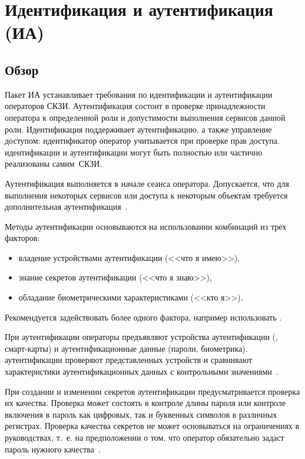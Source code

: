\section{Идентификация и аутентификация (ИА)}\label{IA}

\subsection{Обзор}\label{IA.Intro}

Пакет ИА устанавливает требования по идентификации и аутентификации операторов 
СКЗИ. Аутентификация состоит в проверке принадлежности оператора к определенной 
роли и допустимости выполнения сервисов данной роли. Идентификация поддерживает 
аутентификацию, а также управление доступом: идентификатор оператор 
учитывается при проверке прав доступа.
%
 идентификации и аутентификации могут быть полностью или 
частично реализованы самим~СКЗИ.

Аутентификация выполняется в начале сеанса оператора.
Допускается, что для выполнения некоторых сервисов 
или доступа к некоторым объектам требуется дополнительная 
аутентификация~. 

Методы аутентификации основываются на использовании комбинаций из трех факторов:
\begin{itemize}
\item
владение устройствами аутентификации (<<что я имею>>), 
\item
знание секретов аутентификации (<<что я знаю>>), 
\item
обладание биометрическими характеристиками (<<кто я>>).
\end{itemize}

Рекомендуется задействовать более одного фактора, например использовать 
.

При аутентификации операторы предъявляют устройства аутентификации 
(, смарт-карты) и  аутентификационные данные 
(пароли, биометрика).
%
 аутентификации проверяют  представленных 
устройств и сравнивают характеристики аутентификационных данных с контрольными  
значениями~.

При создании и изменении секретов аутентификации предусматривается проверка их
качества. Проверка может состоять в контроле длины пароля или контроле включения
в пароль как цифровых, так и буквенных символов в различных регистрах. Проверка
качества секретов не может основываться на ограничениях в руководствах, т.~е. на
предположении о том, что оператор обязательно задаст пароль нужного
качества~.

